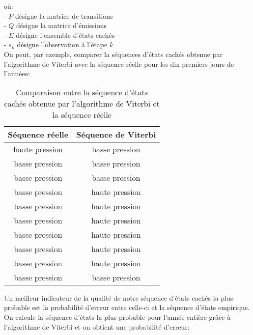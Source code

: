 \documentclass{article}
\begin{document}
\begin{multicols}{2}
où: \\
    - $P$ désigne la matrice de transitions \\
    - $Q$ désigne la matrice d'émissions \\
    - $E$ désigne l'ensemble d'états cachés \\
    - $s_k$ désigne l'observation à l'étape $k$ \\

On peut, par exemple, comparer la séquences d'états cachés obtenue par
l'algorithme de Viterbi avec la séquence réelle pour les dix premiers jours de
l'annéee:

\begin{table}[H]
    \begin{center}
        \centering
        \captionsetup{justification=centering}
        \caption{\label{tab:fwdbwd}Comparaison entre la séquence d'états cachés obtenue par l'algorithme de Viterbi et la séquence réelle}
        \begin{tabular}{|c|c|}
            \hline
            Séquence réelle & Séquence de Viterbi \\
            \hline
            haute pression & basse pression \\
            basse pression & basse pression \\
            basse pression & basse pression \\
            basse pression & haute pression \\
            basse pression & haute pression \\
            basse pression & haute pression \\
            basse pression & haute pression \\
            basse pression & haute pression \\
            basse pression & haute pression \\
            basse pression & basse pression \\
            \hline
        \end{tabular}
    \end{center}
\end{table}

Un meilleur indicateur de la qualité de notre séquence d'états cachés la plus
probable est la probabilité d'erreur entre celle-ci et la séquence d'états
empirique. On calcule la séquence d'états la plus probable pour l'année entière
grâce à l'algorithme de Viterbi et on obtient une probabilité d'erreur:


\end{multicols}
\end{document}
